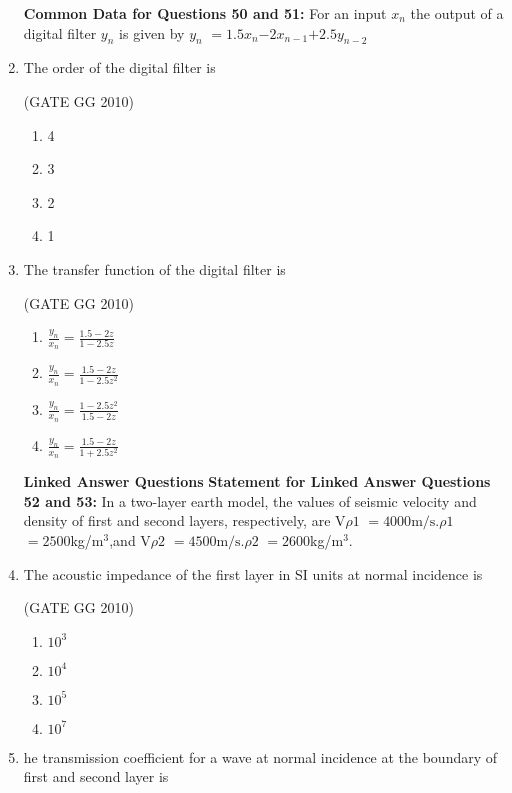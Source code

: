 \documentclass[journal]{IEEEtran}
\begin{document}
\begin{enumerate}[start=26]
\begin{enumerate}
\end{enumerate}
\textbf{Common Data for Questions 50 and 51:}
For an input $x_n$ the output of a digital filter $y_n$ is given by $y_n$ $=1.5$$x_n$$-2$$x_{n-1}$$+     2.5$$y_{n-2}$
\item The order of the digital filter is

\hfill{(GATE GG 2010)}

\begin{enumerate}
    \item  4
    \item 3
\item 2
\item 1 
\end{enumerate}
\item The transfer function of the digital filter is

\hfill{(GATE GG 2010)}

\begin{enumerate}
    \item $\frac{y_n}{x_n}=\frac{1.5-2z}{1-2.5z}$
    \vspace{0.3cm}
    \item $\frac{y_n}{x_n}=\frac{1.5-2z}{1-2.5z^2}$
    \vspace{0.3cm}
    \item  $\frac{y_n}{x_n}=\frac{1-2.5z^2}{1.5-2z}$
    \vspace{0.3cm}
    \item $\frac{y_n}{x_n}=\frac{1.5-2z}{1+2.5z^2}$
\end{enumerate}
\vspace{0.3cm}
\textbf{Linked Answer Questions}
\textbf{Statement for Linked Answer Questions 52 and 53:}
In a two-layer earth model, the values of seismic velocity and density of first and second layers, respectively, are V$\rho 1$ $= 4000 \text{m/s}$.$\rho 1$ $=2500$kg/m$^3$,and  V$\rho 2$ $= 4500 \text{m/s}$.$\rho 2$ $=2600$kg/m$^3$.
\item The acoustic impedance of the first layer in SI units at normal incidence is

\hfill{(GATE GG 2010)}

\begin{enumerate}
    \item  $10^3$
\item  $10^4$
\item  $10^5$
\item  $10^7$
\end{enumerate}
\item he transmission coefficient for a wave at normal incidence at the boundary of first and second layer is


\end{enumerate}
\end{document}
